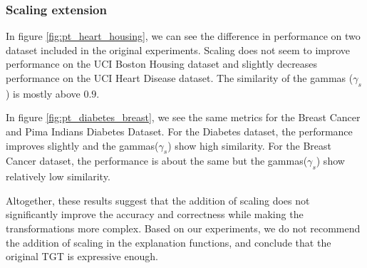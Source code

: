 \subsubsection{Scaling extension}

In figure \ref{fig:pt_heart_housing}, we can see the difference in performance on two dataset included in the original experiments. Scaling does not seem to improve performance on the UCI Boston Housing dataset and slightly decreases performance on the UCI Heart Disease dataset. The similarity of the gammas ($\gamma_s$) is mostly above $0.9$. 

In figure \ref{fig:pt_diabetes_breast},  we see the same metrics for the Breast Cancer and Pima Indians Diabetes Dataset. For the Diabetes dataset, the performance improves slightly and the gammas($\gamma_s$) show high similarity. For the Breast Cancer dataset, the performance is about the same but the gammas($\gamma_s$) show relatively low similarity. 

Altogether, these results suggest that the addition of scaling does not significantly improve the accuracy and correctness while making the transformations more complex. Based on our experiments, we do not recommend the addition of scaling in the explanation functions, and conclude that the original TGT is expressive enough. 

